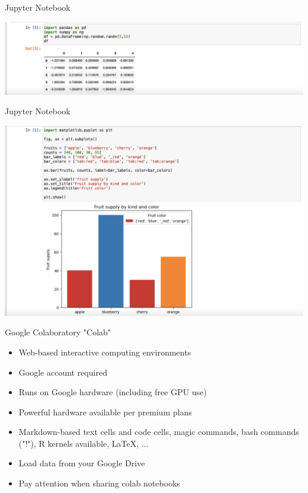 \documentclass[10pt, aspectratio=169]{beamer}
\newcommand{\cemph}[1]{\textcolor{mzescyan}{#1}}
\begin{document}
{\begin{frame}{Jupyter Notebook}

   \begin{center}
       \includegraphics[scale=0.3]{Day 1/Slides/LaTeX files/Notebook1.png}
   \end{center}
    
\end{frame}

\begin{frame}{Jupyter Notebook}

   \begin{center}
       \includegraphics[scale=0.3]{Day 1/Slides/LaTeX files/Notebook4.png}
   \end{center}
    
\end{frame}


\begin{frame}{Google Colaboratory}
    \small
    \cemph{"Colab"}
    \begin{itemize}
        \item Web-based interactive computing environments
        \item Google account required
        \item Runs on Google hardware (including free GPU use)
        \item Powerful hardware available per premium plans
        \item Markdown-based text cells and code cells, magic commands, bash commands ("!"), R kernels available, \LaTeX, ...
        \item Load data from your Google Drive
        \item Pay attention when sharing colab notebooks
    \end{itemize}
    

\end{frame}}
\end{document}
